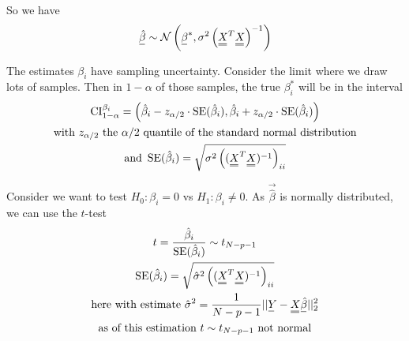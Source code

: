 
So we have
\begin{equation}
    \vec{\hat{\beta}} \sim \mathcal{N}\left(\vec{\beta}^*, \sigma^2 \left(\mat{X}^T \mat{X}\right)^{-1}\right)
\end{equation}

The estimates $\beta_i$ have sampling uncertainty. Consider
the limit where we draw lots of samples. Then in $1-\alpha$
of those samples, the true $\beta_i^*$ will be in the interval
\begin{equation}
    \begin{gathered}
        \operatorname{CI}_{1-\alpha}^{\beta_i} = \left( \hat{\beta}_i - z_{\alpha/2} \cdot \operatorname{SE}( \hat{\beta}_i ), \hat{\beta}_i + z_{\alpha/2} \cdot \operatorname{SE}( \hat{\beta}_i ) \right) \\
        \text{with } z_{\alpha/2} \text{ the } \alpha/2 \text{ quantile of the standard normal distribution} \\
        \text{and } \operatorname{SE}( \hat{\beta}_i ) = \sqrt{\sigma^2 \left( (\mat{X}^T \mat{X})^{-1} \right)_{ii}}
    \end{gathered}
\end{equation}

Consider we want to test $H_0: \beta_i = 0$ vs $H_1: \beta_i \neq 0$. As $\vec{\hat{\beta}}$ is normally distributed, we can use the $t$-test
\begin{equation}
    \begin{gathered}
        t = \frac{\hat{\beta}_i}{\operatorname{SE}(\hat{\beta}_i)} \sim t_{N-p-1} \\
       \operatorname{SE}(\hat{\beta}_i) = \sqrt{\hat{\sigma}^2 \left( (\mat{X}^T \mat{X})^{-1} \right)_{ii}} \\
       \text{here with estimate } \hat{\sigma}^2 = \frac{1}{N-p-1} ||\vec{Y} - \mat{X} \vec{\hat{\beta}}||_2^2 \\
       \text{as of this estimation } t \sim t_{N-p-1} \text{ not normal}
    \end{gathered}
\end{equation}



